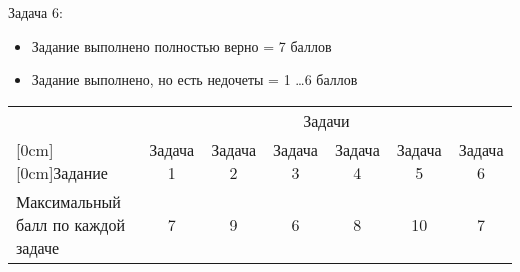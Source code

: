 Задача 6:

\begin{itemize}
    \item	Задание выполнено полностью верно = 7 баллов 
    \item	Задание выполнено, но есть недочеты = 1 \dots 6 баллов
\end{itemize}

\begin{table}[H]
    \begin{center}
        \begin{tabular}{|p{3cm}|c|c|c|c|c|c|}
        \hline
        & \multicolumn{6}{c|}{Задачи} \\
        \cline{2-7}
        \raisebox{1.5ex}[0cm][0cm]{Задание}
        & Задача 1 & Задача 2 & Задача 3 & Задача 4 & Задача 5 & Задача 6\\
        \hline
        Максимальный балл по каждой задаче & 7 & 9 &6&	8	&10&	7\\
        \hline
        \end{tabular}
    \end{center}
\end{table}